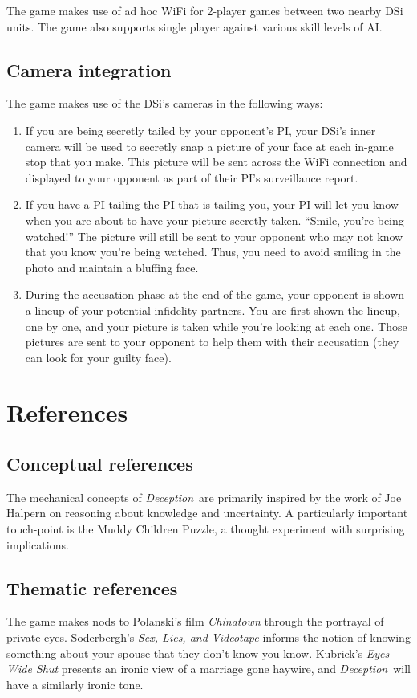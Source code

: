 \documentclass[12pt]{article}
\newcommand{\gtitle}{{\it Deception}}
\begin{document}
The game makes use of ad hoc WiFi for 2-player games between two nearby DSi units.  The game also supports single player against various skill levels of AI.

\subsection{Camera integration}
The game makes use of the DSi's cameras in the following ways:
\begin{enumerate}

\item If you are being secretly tailed by your opponent's PI, your DSi's inner camera will be used to secretly snap a picture of your face at each in-game stop that you make.  This picture will be sent across the WiFi connection and displayed to your opponent as part of their PI's surveillance report.

\item If you have a PI tailing the PI that is tailing you, your PI will let you know when you are about to have your picture secretly taken.  ``Smile, you're being watched!''  The picture will still be sent to your opponent who may not know that you know you're being watched.  Thus, you need to avoid smiling in the photo and maintain a bluffing face.

\item During the accusation phase at the end of the game, your opponent is shown a lineup of your potential infidelity partners.  You are first shown the lineup, one by one, and your picture is taken while you're looking at each one.  Those pictures are sent to your opponent to help them with their accusation (they can look for your guilty face).
\end{enumerate}

\section{References}

\subsection{Conceptual references}
The mechanical concepts of \gtitle\ are primarily inspired by the work of Joe Halpern on reasoning about knowledge and uncertainty.  A particularly important touch-point is the Muddy Children Puzzle, a thought experiment with surprising implications.

\subsection{Thematic references}
The game makes nods to Polanski's film {\it Chinatown} through the portrayal of private eyes.  Soderbergh's {\it Sex, Lies, and Videotape} informs the notion of knowing something about your spouse that they don't know you know.  Kubrick's {\it Eyes Wide Shut} presents an ironic view of a marriage gone haywire, and \gtitle\ will have a similarly ironic tone.
\end{document}
